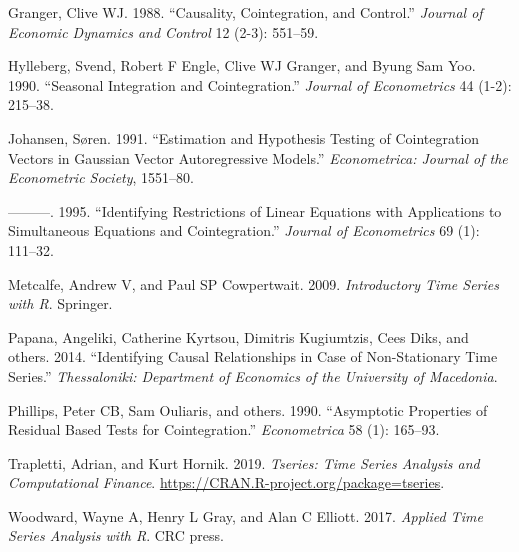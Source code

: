 \documentclass[
  12pt,
]{article}
\newlength{\cslhangindent}
\newenvironment{cslreferences}%
  {\setlength{\parindent}{0pt}%
  \everypar{\setlength{\hangindent}{\cslhangindent}}\ignorespaces}%
  {\par}
\begin{document}
\hypertarget{refs}{}
\begin{cslreferences}
\leavevmode\hypertarget{ref-granger1988causality}{}%
Granger, Clive WJ. 1988. ``Causality, Cointegration, and Control.'' \emph{Journal of Economic Dynamics and Control} 12 (2-3): 551--59.

\leavevmode\hypertarget{ref-hylleberg1990seasonal}{}%
Hylleberg, Svend, Robert F Engle, Clive WJ Granger, and Byung Sam Yoo. 1990. ``Seasonal Integration and Cointegration.'' \emph{Journal of Econometrics} 44 (1-2): 215--38.

\leavevmode\hypertarget{ref-johansen1991estimation}{}%
Johansen, Søren. 1991. ``Estimation and Hypothesis Testing of Cointegration Vectors in Gaussian Vector Autoregressive Models.'' \emph{Econometrica: Journal of the Econometric Society}, 1551--80.

\leavevmode\hypertarget{ref-johansen1995identifying}{}%
---------. 1995. ``Identifying Restrictions of Linear Equations with Applications to Simultaneous Equations and Cointegration.'' \emph{Journal of Econometrics} 69 (1): 111--32.

\leavevmode\hypertarget{ref-metcalfe2009introductory}{}%
Metcalfe, Andrew V, and Paul SP Cowpertwait. 2009. \emph{Introductory Time Series with R}. Springer.

\leavevmode\hypertarget{ref-papana2014identifying}{}%
Papana, Angeliki, Catherine Kyrtsou, Dimitris Kugiumtzis, Cees Diks, and others. 2014. ``Identifying Causal Relationships in Case of Non-Stationary Time Series.'' \emph{Thessaloniki: Department of Economics of the University of Macedonia}.

\leavevmode\hypertarget{ref-phillips1990asymptotic}{}%
Phillips, Peter CB, Sam Ouliaris, and others. 1990. ``Asymptotic Properties of Residual Based Tests for Cointegration.'' \emph{Econometrica} 58 (1): 165--93.

\leavevmode\hypertarget{ref-R-tseries}{}%
Trapletti, Adrian, and Kurt Hornik. 2019. \emph{Tseries: Time Series Analysis and Computational Finance}. \url{https://CRAN.R-project.org/package=tseries}.

\leavevmode\hypertarget{ref-woodward2017applied}{}%
Woodward, Wayne A, Henry L Gray, and Alan C Elliott. 2017. \emph{Applied Time Series Analysis with R}. CRC press.
\end{cslreferences}
\end{document}
